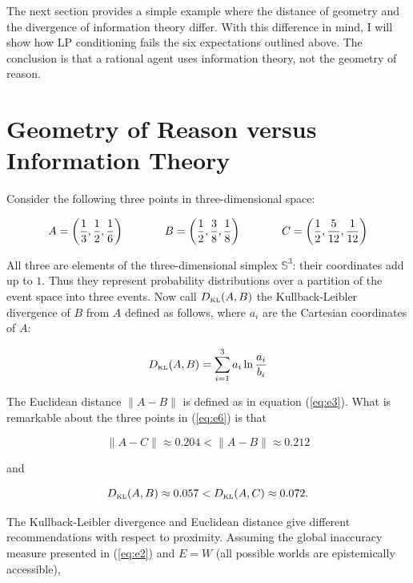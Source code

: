\documentclass[11pt]{article}
\begin{document}
The next section provides a simple example where the distance of
geometry and the divergence of information theory differ. With this
difference in mind, I will show how LP conditioning fails the six
expectations outlined above. The conclusion is that a rational agent
uses information theory, not the geometry of reason.

\section{Geometry of Reason versus Information Theory}
\label{grit}

Consider the following three points in three-dimensional space: 

\begin{equation}
  \label{eq:e6}
    A=\left(\frac{1}{3},\frac{1}{2},\frac{1}{6}\right) \hspace{.5in}
    B=\left(\frac{1}{2},\frac{3}{8},\frac{1}{8}\right)  \hspace{.5in}
    C=\left(\frac{1}{2},\frac{5}{12},\frac{1}{12}\right)
\end{equation}

All three are elements of the three-dimensional simplex
$\mathbb{S}^{3}$: their coordinates add up to $1$. Thus they represent
probability distributions over a partition of the event space into
three events. Now call $D_{\mbox{\tiny KL}}(A,B)$ the Kullback-Leibler
divergence of $B$ from $A$ defined as follows, where $a_{i}$ are the
Cartesian coordinates of $A$:

\begin{equation}
  \label{eq:e7}
  D_{\mbox{\tiny KL}}(A,B)=\sum_{i=1}^{3}a_{i}\ln\frac{a_{i}}{b_{i}}
\end{equation}

The Euclidean distance $\|A-B\|$ is defined as in equation
(\ref{eq:e3}). What is remarkable about the three points in
(\ref{eq:e6}) is that

\begin{equation}
  \label{eq:e8}
  \|A-C\|\approx{}0.204<\|A-B\|\approx{}0.212
\end{equation}

and

\begin{equation}
  \label{eq:e9}
  D_{\mbox{\tiny KL}}(A,B)\approx{}0.057<D_{\mbox{\tiny KL}}(A,C)\approx{}0.072.
\end{equation}

The Kullback-Leibler divergence and Euclidean distance give different
recommendations with respect to proximity. Assuming the global
inaccuracy measure presented in (\ref{eq:e2}) and $E=W$ (all possible
worlds are epistemically accessible),
\end{document}
